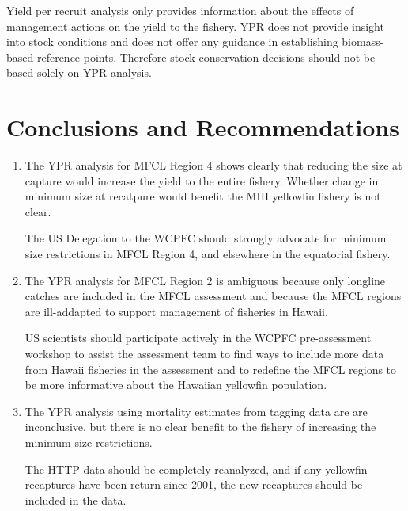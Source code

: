 \documentclass[12pt,letterpaper]{article}
\begin{document}
Yield per recruit analysis only provides information about the effects
of management actions on the yield to the fishery. YPR does not
provide insight into stock conditions and does not offer any guidance
in establishing biomass-based reference points. Therefore stock conservation
decisions should not be based solely on YPR analysis.

\section*{Conclusions and Recommendations}
\begin{enumerate}
\item The YPR analysis for MFCL Region 4 shows clearly that reducing
the size at capture would increase the yield to the entire fishery.
Whether change in minimum size at recatpure would benefit the MHI
yellowfin fishery is not clear.

The US Delegation to the WCPFC should strongly advocate for minimum
size restrictions in MFCL Region 4, and elsewhere in the equatorial
fishery.

\item The YPR analysis for MFCL Region 2 is ambiguous because only
longline catches are included in the MFCL assessment and because the
MFCL regions are ill-addapted to support management of fisheries in
Hawaii.

US scientists should participate actively in the WCPFC pre-assessment
workshop to assist the assessment team to find ways to include more
data from Hawaii fisheries in the assessment and to redefine the MFCL
regions to be more informative about the Hawaiian yellowfin
population.

\item The YPR analysis using mortality estimates from tagging data are
are inconclusive, but there is no clear benefit to the fishery of
increasing the minimum size restrictions.

The HTTP data should be completely reanalyzed, and if any yellowfin
recaptures have been return since 2001, the new recaptures should be
included in the data.
\end{enumerate}
\end{document}
